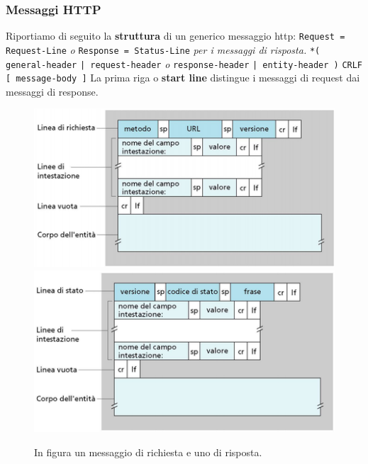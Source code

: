 \documentclass[11pt,a4paper,oneside]{book}
\theoremstyle{definition}
\begin{document}
\subsubsection{Messaggi HTTP}
Riportiamo di seguito la \textbf{struttura} di un generico messaggio http:\newline
\texttt{Request = Request-Line} \textit{o} \texttt{Response = Status-Line} \textit{per i messaggi di risposta.}\newline
\texttt{*( general-header}\newline
\texttt{| request-header} \textit{o} \texttt{response-header}\newline
\texttt{| entity-header )}\newline
\texttt{CRLF}\newline
\texttt{[ message-body ]}\newline
La prima riga o \textbf{start line} distingue i messaggi di request dai messaggi di response.
\begin{figure}[!h]
		\includegraphics[scale=0.43]{Immagini/Http_req.png}
		\includegraphics[scale=0.43]{Immagini/Http_res.png}
		\caption{In figura un messaggio di richiesta e uno di risposta.}
\end{figure}

\pagebreak
\end{document}
